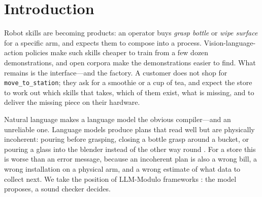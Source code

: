 \documentclass[10pt,twocolumn,letterpaper]{article}
\newcommand{\code}[1]{\texttt{\small #1}}
\begin{document}
\section{Introduction}
Robot skills are becoming products: an operator buys \emph{grasp bottle} or \emph{wipe surface} for a specific arm,
and expects them to compose into a process. Vision-language-action policies
\citep{black2024pi0,pi2025pi05,brohan2023rt2,kim2024openvla,octo2024} make such skills cheaper to train from a few
dozen demonstrations, and open corpora \citep{cadene2024lerobot,khazatsky2024droid,oxe2024} make the demonstrations
easier to find. What remains is the interface---and the factory. A customer does not shop for
\code{move\_to\_station}; they ask for a smoothie or a cup of tea, and expect the store to work out which skills that
takes, which of them exist, what is missing, and to deliver the missing piece on their hardware.

Natural language makes a language model the obvious compiler---and an unreliable one. Language models produce plans
that read well but are physically incoherent: pouring before grasping, closing a bottle grasp around a bucket, or
pouring a glass into the blender instead of the other way round \citep{kambhampati2024llmmodulo,valmeekam2023planbench}.
For a store this is worse than an error message, because an incoherent plan is also a wrong bill, a wrong
installation on a physical arm, and a wrong estimate of what data to collect next. We take the position of
LLM-Modulo frameworks \citep{kambhampati2024llmmodulo}: the model proposes, a sound checker decides.
\end{document}
